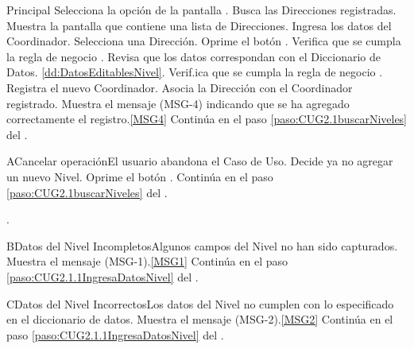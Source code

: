 	\begin{UCtrayectoria}{Principal}
			\UCpaso[\UCactor] Selecciona la opción  de la pantalla .
			\UCpaso Busca las Direcciones registradas.
			\UCpaso Muestra la pantalla  que contiene una lista de Direcciones.
			\UCpaso [\UCactor] Ingresa los datos del Coordinador. \label{paso:CUG2.1.1IngresaDatosNivel}
			\UCpaso [\UCactor] Selecciona una Dirección.
			\UCpaso [\UCactor] Oprime el botón .
			\UCpaso Verifica que se cumpla la regla de negocio .  
			\UCpaso Revisa que los datos correspondan con el Diccionario de Datos. \ref{dd:DatosEditablesNivel}. 
			\UCpaso Verif.ica que se cumpla la regla de negocio .  
			\UCpaso Registra el nuevo Coordinador.
			\UCpaso Asocia la Dirección con el Coordinador registrado.
			\UCpaso Muestra el mensaje (MSG-4) indicando que se ha agregado correctamente el registro.\ref{MSG4}
			\UCpaso Continúa en el paso \ref{paso:CUG2.1buscarNiveles} del .
	\end{UCtrayectoria}

	\begin{UCtrayectoriaA}{A}{Cancelar operación}{El usuario abandona el Caso de Uso.}
			\UCpaso[\UCactor] Decide ya no agregar un nuevo Nivel.
			\UCpaso[\UCactor] Oprime el botón .
			\UCpaso Continúa en el paso \ref{paso:CUG2.1buscarNiveles} del .
	\end{UCtrayectoriaA}
		.
	\begin{UCtrayectoriaA}{B}{Datos del Nivel Incompletos}{Algunos campos del Nivel no han sido capturados.}
			\UCpaso Muestra el mensaje (MSG-1).\ref{MSG1}
			\UCpaso Continúa en el paso \ref{paso:CUG2.1.1IngresaDatosNivel} del .
	\end{UCtrayectoriaA}

	\begin{UCtrayectoriaA}{C}{Datos del Nivel Incorrectos}{Los datos del Nivel no cumplen con lo especificado en el diccionario de datos.}
			\UCpaso Muestra el mensaje (MSG-2).\ref{MSG2}
			\UCpaso Continúa en el paso \ref{paso:CUG2.1.1IngresaDatosNivel} del .
	\end{UCtrayectoriaA}

